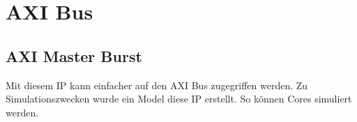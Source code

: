 \section{AXI Bus}

\subsection{AXI Master Burst}
Mit diesem IP kann einfacher auf den AXI Bus zugegriffen werden. Zu Simulationszwecken
wurde ein Model diese IP erstellt. So können Cores simuliert werden.


